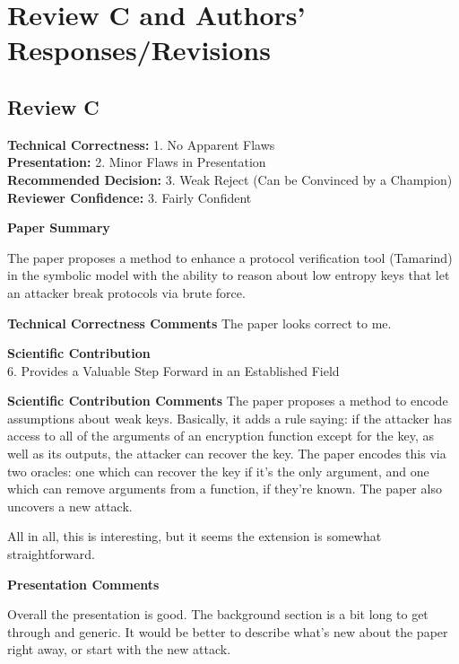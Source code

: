 \documentclass{article}
\newcommand{\response}[1]{\textcolor{red}{\{#1\}}}
\begin{document}
\section{Review C and Authors' Responses/Revisions}
\subsection{Review C}

\noindent\textbf{Technical Correctness:} 1. No Apparent Flaws\\
\textbf{Presentation:} 2. Minor Flaws in Presentation\\
\textbf{Recommended Decision:} 3. Weak Reject (Can be Convinced by a Champion)\\
\textbf{Reviewer Confidence:} 3. Fairly Confident

\rule{0pt}{8pt}

\noindent\textbf{Paper Summary}

The paper proposes a method to enhance a protocol verification tool (Tamarind) in the symbolic model with the ability to reason about low entropy keys that let an attacker break protocols via brute force.

\rule{0pt}{8pt}

\noindent\textbf{Technical Correctness Comments}
The paper looks correct to me.

\rule{0pt}{8pt}

\noindent\textbf{Scientific Contribution}\\
6. Provides a Valuable Step Forward in an Established Field

\rule{0pt}{8pt}

\noindent\textbf{Scientific Contribution Comments}
The paper proposes a method to encode assumptions about weak keys. 
Basically, it adds a rule saying: if the attacker has access to all of the arguments of an encryption function except for the key, as well as its outputs, the attacker can recover the key. 
The paper encodes this via two oracles: one which can recover the key if it's the only argument, and one which can remove arguments from a function, if they're known. 
The paper also uncovers a new attack.

All in all, this is interesting, but it seems the extension is somewhat straightforward.

\rule{0pt}{8pt}

\noindent\textbf{Presentation Comments}

Overall the presentation is good. 
The background section is a bit long to get through and generic. 
It would be better to describe what's new about the paper right away, or start with the new attack.
\end{document}
